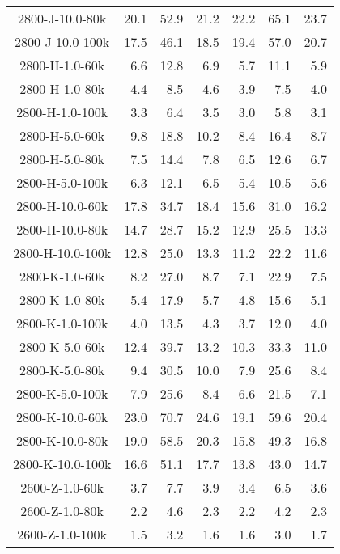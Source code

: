 \begin{longtable}{crrrrrr}
      2800-J-10.0-80k  &  20.1 &  52.9 &  21.2 &  22.2 &  65.1 &  23.7 \\
      2800-J-10.0-100k &  17.5 &  46.1 &  18.5 &  19.4 &  57.0 &  20.7 \\
      2800-H-1.0-60k   &   6.6 &  12.8 &   6.9 &   5.7 &  11.1 &   5.9 \\
      2800-H-1.0-80k   &   4.4 &   8.5 &   4.6 &   3.9 &   7.5 &   4.0 \\
      2800-H-1.0-100k  &   3.3 &   6.4 &   3.5 &   3.0 &   5.8 &   3.1 \\
      2800-H-5.0-60k   &   9.8 &  18.8 &  10.2 &   8.4 &  16.4 &   8.7 \\
      2800-H-5.0-80k   &   7.5 &  14.4 &   7.8 &   6.5 &  12.6 &   6.7 \\
      2800-H-5.0-100k  &   6.3 &  12.1 &   6.5 &   5.4 &  10.5 &   5.6 \\
      2800-H-10.0-60k  &  17.8 &  34.7 &  18.4 &  15.6 &  31.0 &  16.2 \\
      2800-H-10.0-80k  &  14.7 &  28.7 &  15.2 &  12.9 &  25.5 &  13.3 \\
      2800-H-10.0-100k &  12.8 &  25.0 &  13.3 &  11.2 &  22.2 &  11.6 \\
      2800-K-1.0-60k   &   8.2 &  27.0 &   8.7 &   7.1 &  22.9 &   7.5 \\
      2800-K-1.0-80k   &   5.4 &  17.9 &   5.7 &   4.8 &  15.6 &   5.1 \\
      2800-K-1.0-100k  &   4.0 &  13.5 &   4.3 &   3.7 &  12.0 &   4.0 \\
      2800-K-5.0-60k   &  12.4 &  39.7 &  13.2 &  10.3 &  33.3 &  11.0 \\
      2800-K-5.0-80k   &   9.4 &  30.5 &  10.0 &   7.9 &  25.6 &   8.4 \\
      2800-K-5.0-100k  &   7.9 &  25.6 &   8.4 &   6.6 &  21.5 &   7.1 \\
      2800-K-10.0-60k  &  23.0 &  70.7 &  24.6 &  19.1 &  59.6 &  20.4 \\
      2800-K-10.0-80k  &  19.0 &  58.5 &  20.3 &  15.8 &  49.3 &  16.8 \\
      2800-K-10.0-100k &  16.6 &  51.1 &  17.7 &  13.8 &  43.0 &  14.7 \\
      2600-Z-1.0-60k   &   3.7 &   7.7 &   3.9 &   3.4 &   6.5 &   3.6 \\
      2600-Z-1.0-80k   &   2.2 &   4.6 &   2.3 &   2.2 &   4.2 &   2.3 \\
      2600-Z-1.0-100k  &   1.5 &   3.2 &   1.6 &   1.6 &   3.0 &   1.7 \\

\end{longtable}
